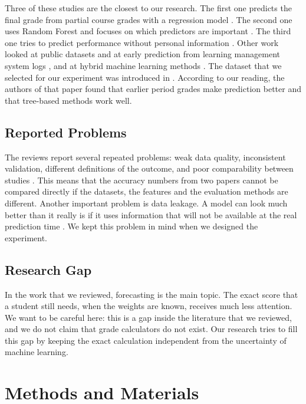 \documentclass[10pt,twocolumn,a4paper]{article}
\begin{document}
Three of these studies are the closest to our research. The first one predicts the final grade from partial course grades with a regression model \cite{hidalgo2023}. The second one uses Random Forest and focuses on which predictors are important \cite{nachouki2023}. The third one tries to predict performance without personal information \cite{chavez2023}. Other work looked at public datasets and at early prediction from learning management system logs \cite{kuzilek2017,balcioglu2025,ng2021,badal2023,santos2023}, and at hybrid machine learning methods \cite{arashpour2023}. The dataset that we selected for our experiment was introduced in \cite{cortez2008}. According to our reading, the authors of that paper found that earlier period grades make prediction better and that tree-based methods work well.

\subsection{Reported Problems}
The reviews report several repeated problems: weak data quality, inconsistent validation, different definitions of the outcome, and poor comparability between studies \cite{namoun2021,sekeroglu2021,roslan2022,alwarthan2022,chaka2022,hellas2018}. This means that the accuracy numbers from two papers cannot be compared directly if the datasets, the features and the evaluation methods are different. Another important problem is data leakage. A model can look much better than it really is if it uses information that will not be available at the real prediction time \cite{kaufman2012}. We kept this problem in mind when we designed the experiment.

\subsection{Research Gap}
In the work that we reviewed, forecasting is the main topic. The exact score that a student still needs, when the weights are known, receives much less attention. We want to be careful here: this is a gap inside the literature that we reviewed, and we do not claim that grade calculators do not exist. Our research tries to fill this gap by keeping the exact calculation independent from the uncertainty of machine learning.

\section{Methods and Materials}
\end{document}
